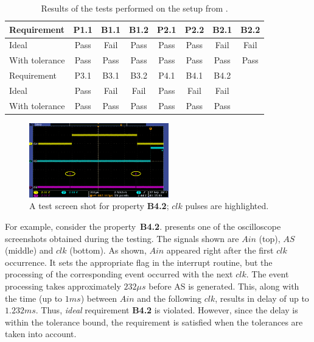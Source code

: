\begin{table}[!b]

\center
{
\begin{tabular}{|l|c|c|c|c|c|c|c|}
\hline
Requirement 		& P1.1 & B1.1 & B1.2 & P2.1 & P2.2 & B2.1 & B2.2 \\\hline
Ideal 					& Pass & Fail & Pass & Pass & Pass & Fail & Fail \\\hline
With tolerance 	& Pass & Pass & Pass & Pass & Pass & Pass & Pass \\\hline
\hline
Requirement 		& P3.1 & B3.1 & B3.2 & P4.1 & B4.1 & B4.2 &\\\hline
Ideal 					& Pass & Fail & Fail & Pass & Fail & Fail &\\\hline
With tolerance 	& Pass & Pass & Pass & Pass & Pass & Pass &\\\hline
\end{tabular}}
\caption{Results of the tests performed on the setup from .}
\label{tab:test_results}
\end{table}


\begin{figure} [!t]
\center
		\includegraphics[width=0.54\textwidth]{figs/tek00003_new1.png}
\caption{A test screen shot for property \textbf{B4.2}; $clk$ pulses are highlighted.}
\label{fig:screen1}
\end{figure}


For example, consider the property~\textbf{B4.2}.  presents one of the oscilloscope screenshots obtained during the testing. The signals shown are $Ain$ (top), $AS$ (middle) and $clk$ (bottom). As shown, $Ain$ appeared right after the first $clk$ occurrence. It sets the appropriate flag in the interrupt routine, but the processing of the corresponding event occurred with the next $clk$. The event processing takes approximately $232 \mu s$ before AS is generated. This, along with the time (up to $1 ms$) between $Ain$ and the following $clk$, results in delay of up to $1.232 ms$. Thus, \textit{ideal} requirement \textbf{B4.2} is violated. However, since the delay is within the tolerance bound, the requirement is satisfied when the tolerances are taken into account.




